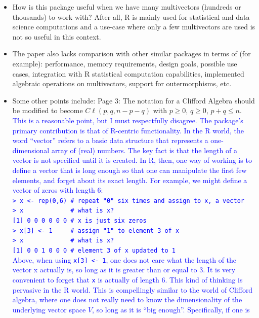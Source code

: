 \documentclass{article}
\newcommand{\cliff}[1]{\ensuremath{C\ell\left(#1\right)}}
\begin{document}
\begin{itemize}
\item How is this package useful when we have many multivectors
  (hundreds or thousands) to work with? After all, R is mainly used
  for statistical and data science computations and a use-case where
  only a few multivectors are used is not so useful in this context.
\item The paper also lacks comparison with other similar packages in
  terms of (for example): performance, memory requirements, design
  goals, possible use cases, integration with R statistical
  computation capabilities, implemented algebraic operations on
  multivectors, support for outermorphisms, etc.
\item Some other points include: Page 3: The notation for a Clifford
  Algebra should be modified to become $\cliff{p,q,n-p-q}$ with $p\geq
  0$, $q\geq 0$, $p+q\leq n$.
\textcolor{blue}{This is a reasonable point, but I must respectfully
  disagree.  The package's primary contribution is that of R-centric
  functionality.  In the R world, the word ``vector'' refers to a
  basic data structure that represents a one-dimensional array of
  (real) numbers.  The key fact is that the length of a vector is not
  specified until it is created.  In R, then, one way of working is to
  define a vector that is long enough so that one can manipulate the
  first few elements, and forget about its exact length.  For example,
  we might define a vector of zeros with length 6:\\[20pt]
  {\tt > x <- rep(0,6)   \# repeat "0" six times and assign to x, a vector}\\
  {\tt > x\ \ \ \ \ \ \ \ \ \ \ \ \ \# what is x?}\\  
  {\tt [1] 0 0 0 0 0 0\ \# x is just six zeros}\\
  {\tt > x[3] <- 1\ \ \ \ \ \# assign "1" to element 3 of x}\\
  {\tt > x\ \ \ \ \ \ \ \ \ \ \ \ \ \# what is x?}\\  
  {\tt [1] 0 0 1 0 0 0\ \# element 3 of x updated to 1}\\[20pt]
Above, when using {\tt x[3] <- 1}, one does not care what the length
of the vector x actually is, so long as it is greater than or equal to
3.  It is very convenient to forget that {\tt x} is actually of length
6. This kind of thinking is pervasive in the R world.  This is
compellingly similar to the world of Clifford algebra, where one does
not really need to know the dimensionality of the underlying vector
space $V$, so long as it is ``big enough''.  Specifically, if one is
}
\end{itemize}
\end{document}

